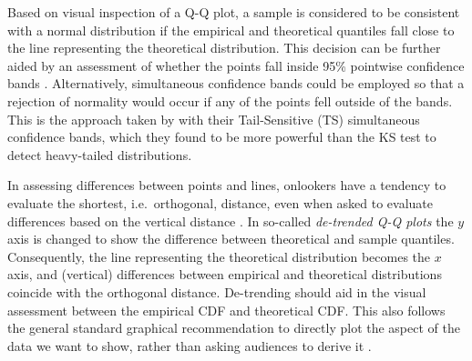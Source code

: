 \documentclass[12pt]{article}\usepackage[]{graphicx}\usepackage[]{color}
\newcommand{\al}[1]{{\color{ForestGreen} #1}}
\newcommand{\alnote}[1]{\todo[inline,color=green!40]{#1}}
\newcommand{\hhnote}[1]{\todo[inline,color=magenta!40]{#1}}
\begin{document}


Based on visual inspection of a Q-Q plot, a
 sample is considered to be consistent with a normal distribution if the empirical and theoretical quantiles fall close to the line representing the theoretical distribution.  This decision can be further aided by an assessment of
 whether the points fall inside 95\%  pointwise confidence bands \citep[][p.~150--154]{Davison:1997}. \al{Alternatively, simultaneous confidence bands could be employed so that a rejection of normality would occur if any of the points fell outside of the bands. This is the approach taken by \citet{buja:2013} with their Tail-Sensitive (TS) simultaneous confidence bands, which they found to be more powerful than the KS test to detect heavy-tailed distributions.
}

In assessing differences between points and lines, onlookers have a tendency to evaluate the shortest, i.e.~orthogonal, distance, even when asked to evaluate differences based on the vertical distance \citep{sineillusion, robbins:2005, cleveland:1984}. 
In so-called {\it de-trended Q-Q plots} \citep[][p.~25--26]{thode:2002} the $y$ axis is changed to show the difference between theoretical and sample quantiles. 
Consequently, the line representing the theoretical distribution becomes the $x$ axis,
and (vertical) differences between empirical and theoretical distributions coincide with the orthogonal distance. 
De-trending should aid in the visual assessment between the empirical CDF and theoretical CDF. This also follows the general standard graphical recommendation to directly plot the aspect of the data we want to show, rather than asking audiences to derive it \citep{wainer:2000}.
\end{document}
